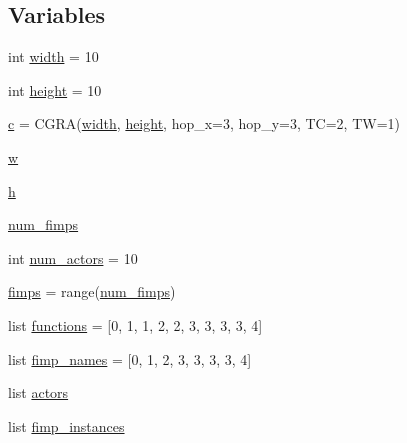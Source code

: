 \subsection*{Variables}
\begin{DoxyCompactItemize}
\item 
int \hyperlink{namespacesylva_1_1code__generation_1_1floorplanner_a495f6aaaaf11f7af939357f74cc2b7ed}{width} = 10
\item 
int \hyperlink{namespacesylva_1_1code__generation_1_1floorplanner_a6d50951a52c9fab6840f9d1230ae0df9}{height} = 10
\item 
\hyperlink{namespacesylva_1_1code__generation_1_1floorplanner_a5ed98e48cee4fdb98cc0772655281931}{c} = C\+G\+RA(\hyperlink{namespacesylva_1_1code__generation_1_1floorplanner_a495f6aaaaf11f7af939357f74cc2b7ed}{width}, \hyperlink{namespacesylva_1_1code__generation_1_1floorplanner_a6d50951a52c9fab6840f9d1230ae0df9}{height}, hop\+\_\+x=3, hop\+\_\+y=3, TC=2, TW=1)
\item 
\hyperlink{namespacesylva_1_1code__generation_1_1floorplanner_a55714ea334ac9b44c63bef8dd9b8569f}{w}
\item 
\hyperlink{namespacesylva_1_1code__generation_1_1floorplanner_a5167c7f70f282e35a3433a7af36acfb0}{h}
\item 
\hyperlink{namespacesylva_1_1code__generation_1_1floorplanner_aa3c18a3eb7fa3c7977cf8602c6570793}{num\+\_\+fimps}
\item 
int \hyperlink{namespacesylva_1_1code__generation_1_1floorplanner_a9d196b124bdd8d4f50072e82ed641c33}{num\+\_\+actors} = 10
\item 
\hyperlink{namespacesylva_1_1code__generation_1_1floorplanner_afaeaba28b2f16ee8837c9af4d8a2211b}{fimps} = range(\hyperlink{namespacesylva_1_1code__generation_1_1floorplanner_aa3c18a3eb7fa3c7977cf8602c6570793}{num\+\_\+fimps})
\item 
list \hyperlink{namespacesylva_1_1code__generation_1_1floorplanner_ad22d3fbef637b5348ba1001937e142d7}{functions} = \mbox{[}0, 1, 1, 2, 2, 3, 3, 3, 3, 4\mbox{]}
\item 
list \hyperlink{namespacesylva_1_1code__generation_1_1floorplanner_ac15687e59fc4e6f08133862f352c13f4}{fimp\+\_\+names} = \mbox{[}0, 1, 2, 3, 3, 3, 3, 4\mbox{]}
\item 
list \hyperlink{namespacesylva_1_1code__generation_1_1floorplanner_a0a7a26c9bd92be126f3b70c232ba81cd}{actors}
\item 
list \hyperlink{namespacesylva_1_1code__generation_1_1floorplanner_aa848249b629c99403c4ea541dd4677a7}{fimp\+\_\+instances}

\end{DoxyCompactItemize}
